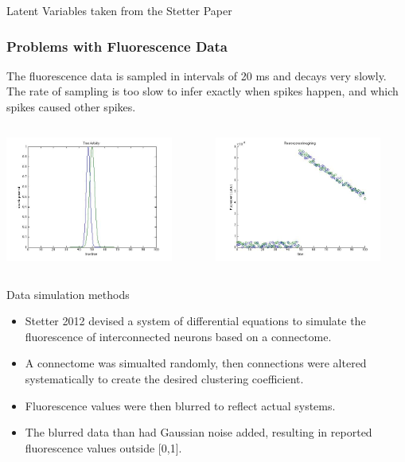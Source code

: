 \documentclass{beamer}
\begin{document}
 \begin{frame}{Latent Variables taken from the Stetter Paper}
\frametitle{Problems with Fluorescence Data}
  The fluorescence data is sampled in intervals of 20 ms and decays very slowly. The rate of sampling is too slow to infer exactly when spikes happen, and which spikes caused other spikes. 
 \begin{columns}[T]
    \begin{column}{.5\textwidth}
   
    \begin{block}{}
 
    \includegraphics[width=55mm]{true_fluorescence_activity.jpg}
   
    \end{block}
  
\end{column}
    \begin{column}{60mm}

     \begin{block}{}
    \includegraphics[width=55mm]{fluorescent_timestep_problem.jpg}
   
    \end{block}
    \end{column}
\end{columns} 

\end{frame}

\begin{frame}{Data simulation methods}
\begin{itemize}
\item Stetter 2012 devised a system of differential equations to simulate the fluorescence of interconnected neurons based on a connectome.
\item A connectome was simualted randomly, then connections were altered systematically to create the desired clustering coefficient.
\item Fluorescence values were then blurred to reflect actual systems.
\item The blurred data than had Gaussian noise added, resulting in reported fluorescence values outside [0,1].
\end{itemize}
\end{frame}
\end{document}
